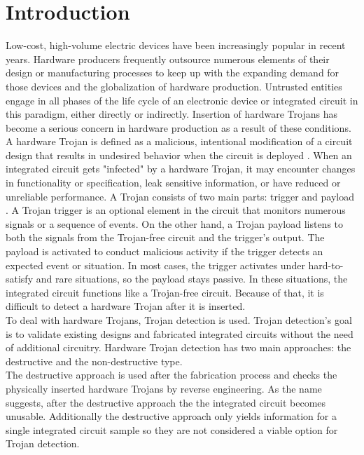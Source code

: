 \chapter{Introduction}
Low-cost, high-volume electric devices have been increasingly popular in recent   years. Hardware producers frequently outsource numerous elements of their design or manufacturing processes to keep up with the expanding demand for those devices and the globalization of hardware production. Untrusted entities engage in all phases of the life cycle of an electronic device or integrated circuit in this paradigm, either directly or indirectly. Insertion of hardware Trojans has become a serious concern in hardware production as a result of these conditions.  \\
A hardware Trojan is defined as a malicious, intentional modification of a circuit design that results in undesired behavior when the circuit is deployed \cite{tehranipoor2011introduction}. When an integrated circuit gets "infected" by a hardware Trojan, it may encounter changes in functionality or specification, leak sensitive information, or have reduced or unreliable performance. A Trojan consists of two main parts: trigger and payload \cite{jin2008hardware}. A Trojan trigger is an optional element in the circuit that monitors numerous signals or a sequence of events. On the other hand, a Trojan payload listens to both the signals from the Trojan-free circuit and the trigger's output. The payload is activated to conduct malicious activity if the trigger detects an expected event or situation. In most cases, the trigger activates under hard-to-satisfy and rare situations, so the payload stays passive. In these situations, the integrated circuit functions like a Trojan-free circuit. Because of that, it is difficult to detect a hardware Trojan after it is inserted. \\
To deal with hardware Trojans, Trojan detection is used. Trojan detection's goal is to validate existing designs and fabricated integrated circuits without the need of additional circuitry. Hardware Trojan detection has two main approaches: the destructive and the non-destructive type. \\
The destructive approach is used after the fabrication process and checks the physically inserted hardware Trojans by reverse engineering. As the name suggests, after the destructive approach the the integrated circuit becomes unusable. Additionally the destructive approach only yields information for a single integrated circuit sample so they are not considered a viable option for Trojan detection. \\
